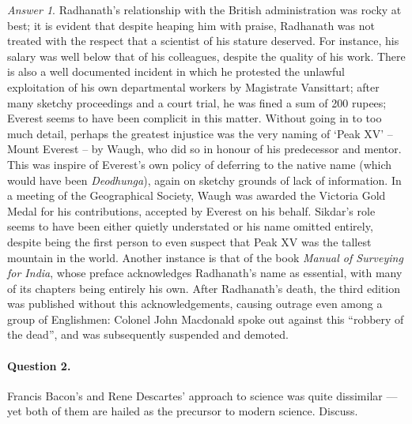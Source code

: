 \documentclass[11pt]{article}
\theoremstyle{remark}
\newtheorem*{answer}{Answer}
\begin{document}
\begin{answer}
        Radhanath's relationship with the British administration was rocky at best;
        it is evident that despite heaping him with praise, Radhanath was not treated
        with the respect that a scientist of his stature deserved. For instance, his
        salary was well below that of his colleagues, despite the quality of his
        work.  There is also a well documented incident in which he protested the
        unlawful exploitation of his own departmental workers by Magistrate
        Vansittart; after many sketchy proceedings and a court trial, he was fined a
        sum of 200 rupees; Everest seems to have been complicit in this matter.
        Without going in to too much detail, perhaps the greatest injustice was the
        very naming of `Peak XV' -- Mount Everest -- by Waugh, who did so in honour
        of his predecessor and mentor. This was inspire of Everest's own policy of
        deferring to the native name (which would have been \emph{Deodhunga}), again
        on sketchy grounds of lack of information. In a meeting of the Geographical
        Society, Waugh was awarded the Victoria Gold Medal for his contributions,
        accepted by Everest on his behalf. Sikdar's role seems to have been either
        quietly understated or his name omitted entirely, despite being the first
        person to even suspect that Peak XV was the tallest mountain in the world.
        Another instance is that of the book \emph{Manual of Surveying for India},
        whose preface acknowledges Radhanath's name as essential, with many of its
        chapters being entirely his own. After Radhanath's death, the third edition
        was published without this acknowledgements, causing outrage even among a
        group of Englishmen: Colonel John Macdonald spoke out against this ``robbery
        of the dead'', and was subsequently suspended and demoted.

    \end{answer}

    \paragraph{Question 2.} Francis Bacon's and Rene Descartes' approach to science
    was quite dissimilar --- yet both of them are hailed as the precursor to modern
    science. Discuss.
\end{document}

